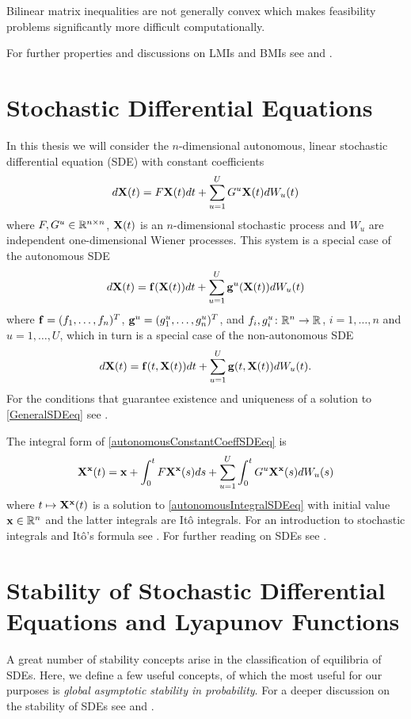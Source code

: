 \documentclass[a4paper,12pt,twoside,BCOR=10mm]{scrbook}
\begin{document}
Bilinear matrix inequalities are not generally convex which makes feasibility problems significantly more difficult computationally.

For further properties and discussions on LMIs and BMIs see \citep{vABr2000lmibmi} and \citep{KZM2018BMI1}.

\section{Stochastic Differential Equations}\label{SectionSDE}
In this thesis we will consider the $n$-dimensional autonomous, linear stochastic differential equation (SDE) with constant coefficients
\begin{align}\label{autonomousConstantCoeffSDEeq}
    d\mathbf{X}(t) = F\mathbf{X}(t)dt + \sum\limits_{u = 1}^UG^u \mathbf{X}(t)dW_u(t)
\end{align}
where $F,G^u \in \mathbb{R}^{n\times n}$, $\mathbf{X}(t)$ is an $n$-dimensional stochastic process and $W_u$ are independent one-dimensional Wiener processes.
This system is a special case of the autonomous SDE
\begin{align}\label{autonomousGeneralSDEeq}
    d\mathbf{X}(t) = \mathbf{f}(\mathbf{X}(t))dt + \sum_{u=1}^U \mathbf{g}^u(\mathbf{X}(t))dW_u(t)
\end{align}
where $\mathbf{f} = (f_1, \ldots, f_n)^T$, $\mathbf{g}^u = (g_1^u,\ldots,g_n^u)^T$, and $f_i, g_i^u\colon \mathbb{R}^{n} \to \mathbb{R}^{} $, $i = 1, \ldots, n$ and $u = 1,\ldots, U$, which in turn is a special case of the non-autonomous SDE
\begin{align}\label{GeneralSDEeq}
    d\mathbf{X}(t) = \mathbf{f}(t, \mathbf{X}(t))dt + \sum\limits_{u=1}^U\mathbf{g}(t, \mathbf{X}(t))dW_u(t).
\end{align}
For the conditions that guarantee existence and uniqueness of a solution to \eqref{GeneralSDEeq} see \citep{mao2007stochastic}.

The integral form of \eqref{autonomousConstantCoeffSDEeq} is
\begin{align}\label{autonomousIntegralSDEeq}
    \mathbf{X}^{\mathbf{x}}(t) = \mathbf{x} + \int_0^tF\mathbf{X}^{\mathbf{x}}(s)ds + \sum_{u = 1}^U \int_0^tG^u\mathbf{X}^{\mathbf{x}}(s)dW_u(s)
\end{align}
where $t \mapsto \mathbf{X}^{\mathbf{x}} (t)$ is a solution to \eqref{autonomousIntegralSDEeq} with initial value $\mathbf{x}\in\mathbb{R}^{n}$ and the latter integrals are Itô integrals. For an introduction to stochastic integrals and Itô's formula see \citep{brzezniak2000basic}. For further reading on SDEs see \citep{sdestab1974arnold, sdeoks2010, mao2007stochastic, sdestab2012khaminskii}.

\section{Stability of Stochastic Differential Equations and Lyapunov Functions}\label{SectionStabilitySDE}
A great number of stability concepts arise in the classification of equilibria of SDEs. Here, we define a few useful concepts, of which the most useful for our purposes is \textit{global asymptotic stability in probability}. For a deeper discussion on the stability of SDEs see \citep{mao2007stochastic} and \citep{sdestab2012khaminskii}.
\end{document}
